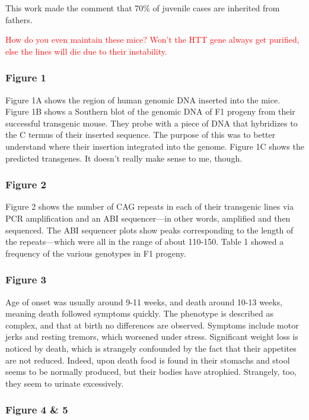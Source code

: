 This work made the comment that 70\% of juvenile cases are inherited from fathers.\newline

\textcolor{red}{How do you even maintain these mice? Won't the HTT gene always get purified, else the lines will die due to their instability.}

\subsubsection*{Figure 1}

Figure 1A shows the region of human genomic DNA inserted into the mice. Figure 1B shows a Southern blot of the genomic DNA of F1 progeny from their successful transgenic mouse. They probe with a piece of DNA that hybridizes to the C termus of their inserted sequence. The purpose of this was to better understand where their insertion integrated into the genome. Figure 1C shows the predicted transgenes. It doesn't really make sense to me, though. 

\subsubsection*{Figure 2}

Figure 2 shows the number of CAG repeats in each of their transgenic lines via PCR amplification and an ABI sequencer---in other words, amplified and then sequenced. The ABI sequencer plots show peaks corresponding to the length of the repeats---which were all in the range of about 110-150. Table 1 showed a frequency of the various genotypes in F1 progeny. 

 \subsubsection*{Figure 3}

 Age of onset was usually around 9-11 weeks, and death around 10-13 weeks, meaning death followed symptoms quickly. The phenotype is described as complex, and that at birth no differences are observed. Symptoms include motor jerks and resting tremors, which worsened under stress. Significant weight loss is noticed by death, which is strangely confounded by the fact that their appetites are not reduced. Indeed, upon death food is found in their stomachs and stool seems to be normally produced, but their bodies have atrophied. Strangely, too, they seem to urinate excessively.

 \subsubsection*{Figure 4 \& 5}

